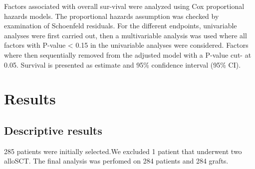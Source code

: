\documentclass[a4paper,11pt] {article}
\begin{document}
Factors associated with overall sur-vival were analyzed using Cox proportional hazards models. The proportional hazards assumption was checked by examination of Schoenfeld residuals.
For the different endpoints, univariable analyses were first carried out, then a multivariable analysis was used where all factors with P-value < 0.15 in the univariable analyses were considered. Factors where then sequentially removed from the adjusted model with a P-value cut- at 0.05. 
Survival is presented as estimate and 95\% confidence interval (95\% CI).




\pagebreak[4]
\section{Results}





\subsection{Descriptive results}
 285 patients were initially selected.We excluded 1 patient that underwent two alloSCT. The final analysis was perfomed on 284 patients and 284 grafts.
\end{document}
